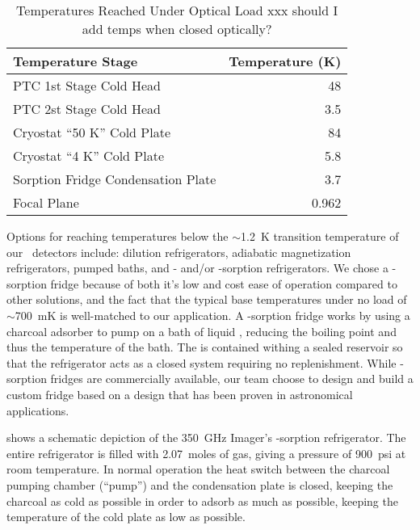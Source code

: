 \begin{table*}[t]
\centering
\caption{Temperatures Reached Under Optical Load xxx should I add temps when closed optically?}
\label{tab:temp-optical-load}
\begin{tabular}{l r}
\toprule
Temperature Stage &  Temperature (K)\\
\midrule
PTC 1st Stage Cold Head 			& 48 \\
PTC 2st Stage Cold Head 			& 3.5 \\
Cryostat ``50 K'' Cold Plate 		& 84 \\
Cryostat ``4 K'' Cold Plate 			& 5.8 \\
Sorption Fridge Condensation Plate 	& 3.7 \\
Focal Plane 						& 0.962 \\
\bottomrule
\end{tabular}
\end{table*}

Options for reaching temperatures below the $\sim$1.2~K transition temperature of our \TES\ detectors include: dilution refrigerators, adiabatic magnetization refrigerators, pumped  baths, and - and/or -sorption refrigerators.
We chose a -sorption fridge because of both it's low and cost ease of operation compared to other solutions, and the fact that the typical base temperatures under no load of $\sim$700~mK is well-matched to our application.
A  -sorption fridge works by using a charcoal adsorber to pump on a bath of liquid , reducing the  boiling point and thus the temperature of the bath.
The  is contained withing a sealed reservoir so that the refrigerator acts as a closed system requiring no  replenishment. 
While -sorption fridges are commercially available, our team choose to design and build a custom fridge based on a design that has been proven in astronomical applications\cite{devlin_high_2004}.

 shows a schematic depiction of the 350~GHz Imager's -sorption refrigerator.
The entire refrigerator is filled with 2.07~moles of  gas, giving a pressure of 900~psi at room temperature.
In normal operation the heat switch between the charcoal pumping chamber (``pump'') and the  condensation plate is closed, keeping the charcoal as cold as possible in order to adsorb as much  as possible, keeping the temperature of the cold plate as low as possible.

